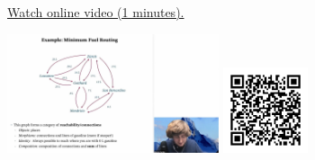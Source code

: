 
\begin{minipage}{10cm}
    \href{https://act4e-spring21.netlify.app/videos/spring2021-enrichment:recap-monoidal.html}{Watch online video (1 minutes).}
        
    \href{https://act4e-spring21.netlify.app/videos/spring2021-enrichment:recap-monoidal.html}{\includegraphics[height=3.5cm]{spring2021-enrichment:recap-monoidal/thumbnails.jpg}}
    \href{https://act4e-spring21.netlify.app/videos/spring2021-enrichment:recap-monoidal.html}{\includegraphics[height=2.5cm]{spring2021-enrichment:recap-monoidal/qrcode.png}}
\end{minipage}
